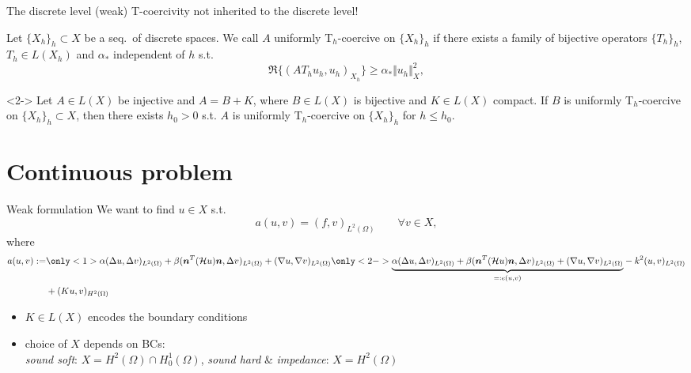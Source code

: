 \documentclass[11pt,aspectratio=169,xcolor=dvipsnames]{beamer}
\newcommand{\nicearrow}[2]{\raisebox{#2}{\resizebox{0.45cm}{!}{\color{#1}{\MVRightArrow}\color{black}}}}
\begin{document}
\begin{frame}{The discrete level}
  \nicearrow{GOE}{-0.07cm} (weak) T-coercivity not inherited to the discrete level!
  \begin{definition}
    Let $\{ X_h \}_{h} \subset X$ be a seq.~of discrete spaces. We call $A$ uniformly T$_h$-coercive on $\{ X_h \}_h$ if there exists a family of bijective operators $\{ T_h \}_h$, $T_h \in L(X_h)$ and  $\alpha_{\ast}$ independent of $h$ s.t. 
    \begin{equation*}
      \Re \{ (A T_hu_h,u_h)_{X_h} \} \ge \alpha_{\ast} \Vert u_h \Vert_{X}^2,
    \end{equation*}
  \end{definition} 
  \begin{theorem}<2->
    Let $A \in L(X)$ be \alert{injective} and $A = B + K$, where $B \in L(X)$ is \alert{bijective} and $K \in L(X)$ \alert{compact}. If \alert{$B$ is uniformly T$_h$-coercive} on $\{X_h\}_h \subset X$, then there exists $h_0 > 0$ s.t. $A$ is uniformly T$_h$-coercive on $\{X_h\}_h$ for $h \le h_0$.
  \end{theorem}
\end{frame}

\section{Continuous problem}
\mysectionpage

\begin{frame}{Weak formulation}
  We want to find $u \in X$ s.t. 
  \begin{equation}
    a(u,v) = (f,v)_{L^2(\Omega)} \qquad \forall v \in X, \tag{CP} \label{CP}
  \end{equation}
  where 
  \begin{align*}
    a(u,v) := &\only<1>{\alpha (\Delta u, \Delta v)_{L^2(\Omega)} + \beta (\bm{n}^T (\mathcal{H} u) \bm{n}, \Delta v)_{L^2(\Omega)} + (\nabla u, \nabla v)_{L^2(\Omega)}}\only<2->{\underbrace{\alpha (\Delta u, \Delta v)_{L^2(\Omega)} + \beta (\bm{n}^T (\mathcal{H} u) \bm{n}, \Delta v)_{L^2(\Omega)} + (\nabla u, \nabla v)_{L^2(\Omega)}}_{=: e(u,v)}} - k^2(u,v)_{L^2(\Omega)} \\
    &+ (Ku,v)_{H^2(\Omega)}
  \end{align*}
  \begin{itemize}
    \item[\nicearrow{GOE}{-0.06cm}] $K \in L(X)$ encodes the boundary conditions
    \item[\nicearrow{GOE}{-0.06cm}] choice of $X$ depends on BCs: \\
    \quad \emph{sound soft}: $X = H^2(\Omega) \cap H^1_0(\Omega)$, \emph{sound hard} \& \emph{impedance}: $X = H^2(\Omega)$
  \end{itemize}
\end{frame}
\end{document}
